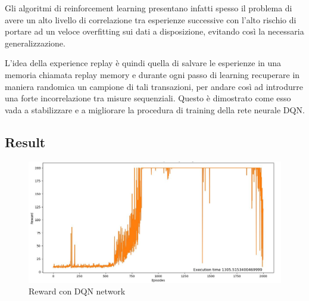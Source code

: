 Gli algoritmi di reinforcement learning presentano infatti spesso il problema di avere un alto livello di correlazione tra esperienze successive con l'alto rischio di portare ad un veloce overfitting sui dati a disposizione, evitando così la necessaria generalizzazione.

L’idea della experience replay è quindi quella di salvare le esperienze
in una memoria chiamata replay memory e durante ogni passo di learning recuperare in maniera randomica un campione di tali transazioni, per andare così ad introdurre una forte incorrelazione tra misure sequenziali.
Questo è dimostrato come esso vada a stabilizzare e a migliorare la procedura di training della rete neurale DQN.

\subsection{Result}
\begin{figure}[!h]
	\centering
	\includegraphics[width=\textwidth]{Immagini/DQN_Agent.JPG}
	\caption{Reward con DQN network}
	\label{fig:DQN_reward}
\end{figure}

\newpage